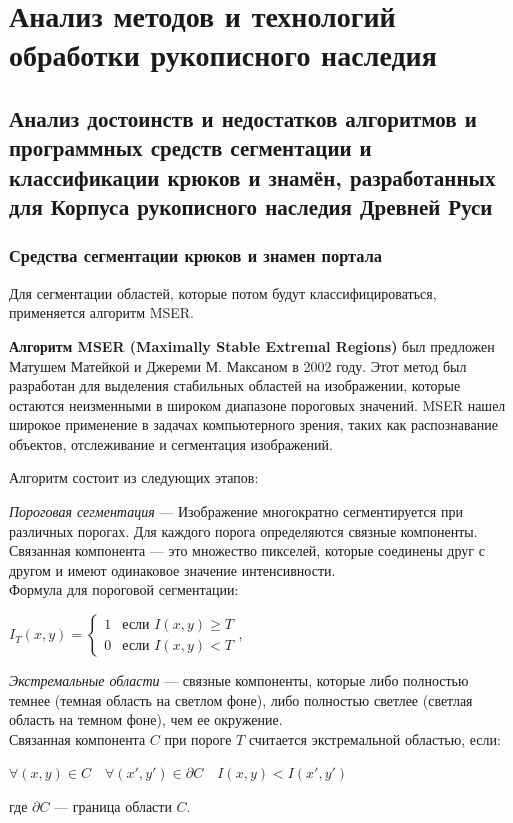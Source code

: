 \chapter{Анализ методов и технологий обработки рукописного наследия}
\label{chapter1}

\section{Анализ достоинств и недостатков алгоритмов и программных средств сегментации и классификации крюков и знамён, разработанных для Корпуса рукописного наследия Древней Руси}

\subsection{Средства сегментации крюков и знамен портала}

Для сегментации областей, которые потом будут классифицироваться, применяется алгоритм MSER.

\textbf{Алгоритм MSER (Maximally Stable Extremal Regions)} был предложен Матушем Матейкой и 
Джереми М. Максаном в 2002 году. Этот метод был разработан для выделения стабильных 
областей на изображении, которые остаются неизменными в широком диапазоне пороговых значений. 
MSER нашел широкое применение в задачах компьютерного зрения, таких как распознавание объектов, 
отслеживание и сегментация изображений\cite{MGonsales}.


Алгоритм состоит из следующих этапов:

\textit{Пороговая сегментация} — Изображение многократно сегментируется при различных порогах. Для каждого порога определяются связные компоненты. 
		Связанная компонента — это множество пикселей, которые соединены друг с другом и имеют одинаковое значение интенсивности. \\
		Формула для пороговой сегментации:
		\begin{center}
			$I_T(x, y) = 
			\begin{cases} 
			1 & \text{если } I(x, y) \ge T \\
			0 & \text{если } I(x, y) < T 
			\end{cases}$,
		\end{center}

\textit{Экстремальные области} — связные компоненты, которые либо полностью темнее (темная область на светлом фоне), 
		либо полностью светлее (светлая область на темном фоне), чем ее окружение. \\
		Связанная компонента \( C \) при пороге \( T \) считается экстремальной областью, если:
		\begin{center}
			$\forall (x, y) \in C \quad \forall (x', y') \in \partial C \quad I(x, y) < I(x', y')$
		\end{center}
		где \( \partial C \) — граница области \( C \).

